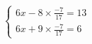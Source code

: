 \documentclass[preview]{standalone}
\begin{document}
\begin{align*}
\left\{ \begin{array}{rcl} 6x - 8\times\frac{-7}{17}  =  13 \\ 6x + 9\times\frac{-7}{17} = 6 \end{array} \right.
\end{align*}
\end{document}

